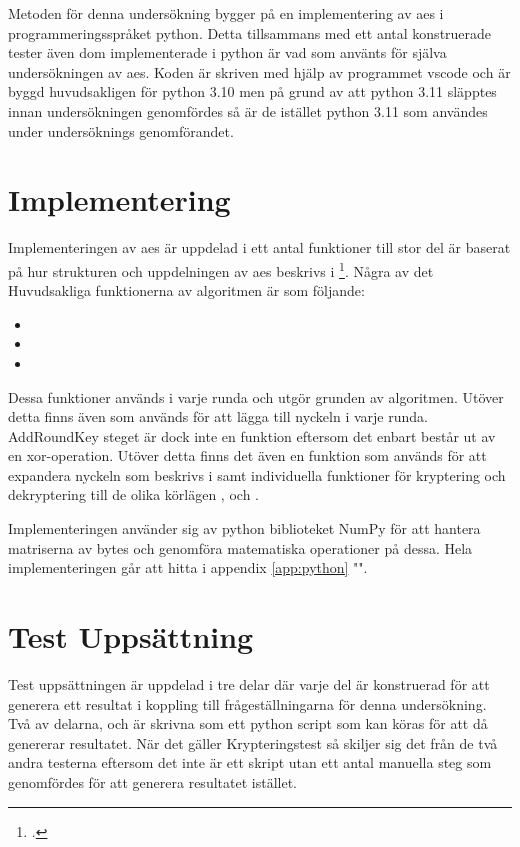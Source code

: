 Metoden för denna undersökning bygger på en implementering av \acrshort{aes} i programmeringsspråket
\gls{python}. Detta tillsammans med ett antal konstruerade tester även dom implementerade i
\gls{python} är vad som använts för själva undersökningen av \acrshort{aes}. Koden
är skriven med hjälp av programmet \gls{vscode} och är byggd huvudsakligen för \gls{python} 3.10 men
på grund av att \gls{python} 3.11 släpptes innan undersökningen genomfördes så är de istället \gls{python} 3.11
som användes under undersöknings genomförandet.

\section{Implementering} %
Implementeringen av \acrshort{aes} är uppdelad i ett antal funktioner till stor del är baserat på
hur strukturen och uppdelningen av \acrshort{aes} beskrivs i \footcite{daemen1999aes}.
Några av det Huvudsakliga funktionerna av algoritmen är som följande:
\begin{itemize}
    \item \texttt{}
    \item \texttt{}
    \item \texttt{}
\end{itemize}

Dessa funktioner används i varje runda och utgör grunden av algoritmen. Utöver detta finns
även  som används för att lägga till nyckeln i varje runda. AddRoundKey steget är dock inte
en funktion eftersom det enbart består ut av en \gls{xor}-operation. Utöver detta finns det även
en funktion som används för att expandera nyckeln som beskrivs i  samt
individuella funktioner för kryptering och dekryptering till de olika körlägen ,  och
.

Implementeringen använder sig av \gls{python} biblioteket NumPy för att hantera matriserna av \gls{byte}s och genomföra
matematiska operationer på dessa. Hela implementeringen går att hitta i appendix \ref{app:python} "".

\section{Test Uppsättning} %
Test uppsättningen är uppdelad i tre delar där varje del är konstruerad för att generera ett
resultat i koppling till frågeställningarna för denna undersökning. Två av delarna,  och
 är skrivna som ett \gls{python} script som kan köras för att då genererar
resultatet. När det gäller Krypteringstest så skiljer sig det från de två andra testerna eftersom det
inte är ett skript utan ett antal manuella steg som genomfördes för att generera resultatet istället.

